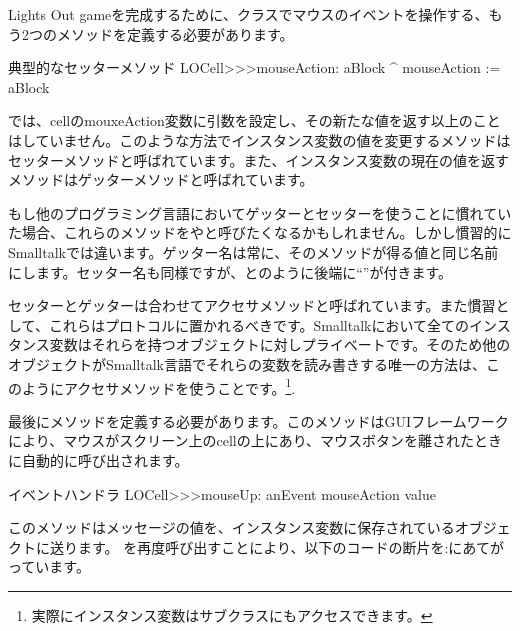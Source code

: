 \documentclass[a4paper,10pt,twoside]{book}
\begin{document}
Lights Out gameを完成するために、クラスでマウスのイベントを操作する、もう2つのメソッドを定義する必要があります。
\begin{method}[mouseAction:]{典型的なセッターメソッド}
LOCell>>>mouseAction: aBlock
   ^ mouseAction := aBlock
\end{method}

 では、cellのmouxeAction変数に引数を設定し、その新たな値を返す以上のことはしていません。このような方法でインスタンス変数の値を変更するメソッドはセッターメソッドと呼ばれています。また、インスタンス変数の現在の値を返すメソッドはゲッターメソッドと呼ばれています。

もし他のプログラミング言語においてゲッターとセッターを使うことに慣れていた場合、これらのメソッドをやと呼びたくなるかもしれません。しかし慣習的にSmalltalkでは違います。ゲッター名は常に、そのメソッドが得る値と同じ名前にします。セッター名も同様ですが、とのように後端に``\ct{:}''が付きます。

セッターとゲッターは合わせてアクセサメソッドと呼ばれています。また慣習として、これらはプロトコルに置かれるべきです。Smalltalkにおいて全てのインスタンス変数はそれらを持つオブジェクトに対しプライベートです。そのため他のオブジェクトがSmalltalk言語でそれらの変数を読み書きする唯一の方法は、このようにアクセサメソッドを使うことです。\footnote{実際にインスタンス変数はサブクラスにもアクセスできます。
}.


最後にメソッドを定義する必要があります。このメソッドはGUIフレームワークにより、マウスがスクリーン上のcellの上にあり、マウスボタンを離されたときに自動的に呼び出されます。

\begin{method}[sbecellmouseup]{イベントハンドラ}
LOCell>>>mouseUp: anEvent
   mouseAction value
\end{method}


このメソッドはメッセージの値を、インスタンス変数に保存されているオブジェクトに送ります。 を再度呼び出すことにより、以下のコードの断片を:にあてがっています。
\end{document}

